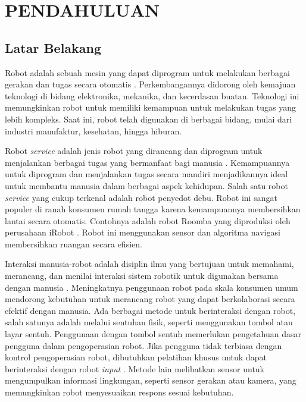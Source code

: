 \chapter{PENDAHULUAN}
\label{chap:pendahuluan}


\section{Latar Belakang}
\label{sec:latarbelakang}

Robot adalah sebuah mesin yang dapat diprogram untuk melakukan berbagai gerakan dan tugas secara otomatis \parencite{singh2022robots}. Perkembangannya didorong oleh kemajuan teknologi di bidang elektronika, mekanika, dan kecerdasan buatan. Teknologi ini memungkinkan robot untuk memiliki kemampuan untuk melakukan tugas yang lebih kompleks. Saat ini, robot telah digunakan di berbagai bidang, mulai dari industri manufaktur, kesehatan, hingga hiburan.

Robot \textit{service} adalah jenis robot yang dirancang dan diprogram untuk menjalankan
berbagai tugas yang bermanfaat bagi manusia \parencite{gonzalez2021service}. Kemampuannya untuk diprogram dan menjalankan tugas secara mandiri menjadikannya ideal untuk membantu manusia dalam berbagai aspek kehidupan. Salah satu robot \textit{service} yang cukup terkenal adalah robot penyedot debu. Robot ini sangat populer di ranah konsumen rumah tangga karena kemampuannya membersihkan lantai secara otomatis. Contohnya adalah robot Roomba yang diproduksi oleh perusahaan iRobot \parencite{6907681}. Robot ini menggunakan sensor dan algoritma navigasi membersihkan ruangan secara efisien.

Interaksi manusia-robot adalah disiplin ilmu yang bertujuan untuk memahami, merancang, dan menilai interaksi sistem robotik untuk digunakan bersama dengan manusia \parencite{mohebbi2020human}. Meningkatnya penggunaan robot pada skala konsumen umum mendorong kebutuhan untuk merancang robot yang dapat berkolaborasi secara efektif dengan manusia.  Ada berbagai metode untuk berinteraksi dengan robot, salah satunya adalah melalui sentuhan fisik, seperti menggunakan tombol atau layar sentuh. Penggunaan dengan tombol sentuh memerlukan pengetahuan dasar pengguna dalam pengoperasian robot. Jika pengguna tidak terbiasa dengan kontrol pengoperasian robot, dibutuhkan pelatihan khusus untuk dapat berinteraksi dengan robot \emph{input} \parencite{bragajulio}. Metode lain melibatkan sensor untuk mengumpulkan informasi lingkungan, seperti sensor gerakan atau kamera, yang memungkinkan robot menyesuaikan respons sesuai kebutuhan.

